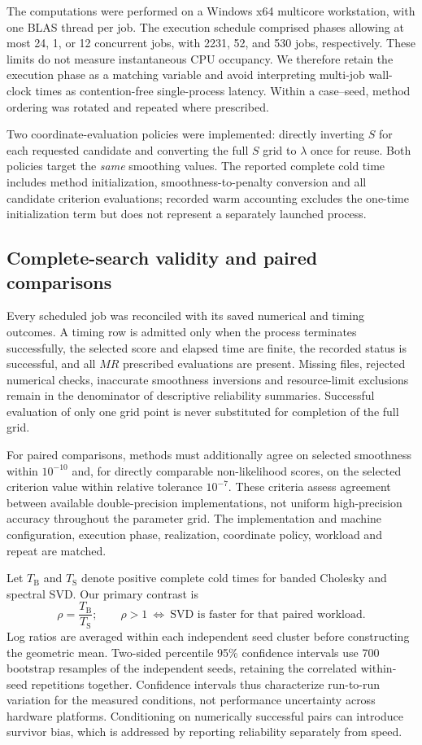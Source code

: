 The computations were performed on a Windows x64 multicore workstation, with one BLAS thread per job. The execution schedule comprised phases allowing at most 24, 1, or 12 concurrent jobs, with 2231, 52, and 530 jobs, respectively. These limits do not measure instantaneous CPU occupancy. We therefore retain the execution phase as a matching variable and avoid interpreting multi-job wall-clock times as contention-free single-process latency. Within a case--seed, method ordering was rotated and repeated where prescribed.

Two coordinate-evaluation policies were implemented: directly inverting $S$ for each requested candidate and converting the full $S$ grid to $\lambda$ once for reuse. Both policies target the \emph{same} smoothing values. The reported complete cold time includes method initialization, smoothness-to-penalty conversion and all candidate criterion evaluations; recorded warm accounting excludes the one-time initialization term but does not represent a separately launched process.

\subsection{Complete-search validity and paired comparisons}
Every scheduled job was reconciled with its saved numerical and timing outcomes. A timing row is admitted only when the process terminates successfully, the selected score and elapsed time are finite, the recorded status is successful, and all $MR$ prescribed evaluations are present. Missing files, rejected numerical checks, inaccurate smoothness inversions and resource-limit exclusions remain in the denominator of descriptive reliability summaries. Successful evaluation of only one grid point is never substituted for completion of the full grid.

For paired comparisons, methods must additionally agree on selected smoothness within $10^{-10}$ and, for directly comparable non-likelihood scores, on the selected criterion value within relative tolerance $10^{-7}$. These criteria assess agreement between available double-precision implementations, not uniform high-precision accuracy throughout the parameter grid. The implementation and machine configuration, execution phase, realization, coordinate policy, workload and repeat are matched.

Let $T_{\mathrm{B}}$ and $T_{\mathrm{S}}$ denote positive complete cold times for banded Cholesky and spectral SVD. Our primary contrast is
\begin{equation}\label{eq:ratio}
\rho=\frac{T_{\mathrm{B}}}{T_{\mathrm{S}}};
\qquad
\rho>1 \ \Longleftrightarrow\ 
\text{SVD is faster for that paired workload}.
\end{equation}
Log ratios are averaged within each independent seed cluster before constructing the geometric mean. Two-sided percentile 95\% confidence intervals use 700 bootstrap resamples of the independent seeds, retaining the correlated within-seed repetitions together. Confidence intervals thus characterize run-to-run variation for the measured conditions, not performance uncertainty across hardware platforms. Conditioning on numerically successful pairs can introduce survivor bias, which is addressed by reporting reliability separately from speed.
